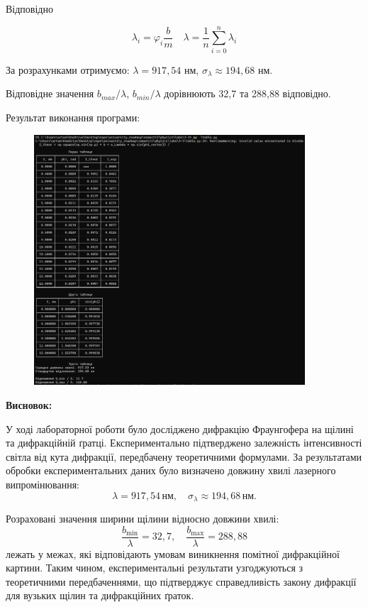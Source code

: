 \documentclass[12pt,a4paper]{article}
\begin{document}
    Відповідно

    \[
    \lambda_i = \varphi_i\frac{b}{m} \quad \lambda = \frac{1}{n} \sum_{i=0}^{n} \lambda_i
    \]

    За розрахунками отримуємо: $\lambda = 917,54$ нм, $\sigma_{\lambda} \approx 194,68 $ нм.

    Відповідне значення $b_{max}\slash \lambda$, $b_{min} \slash \lambda$ дорівнюють 32,7 та 288,88 відповідно.

    \newpage

    \setlength{\parindent}{0pt}

    Результат виконання програми:

    \begin{figure}[ht]
        \includegraphics[width=0.9\textwidth]{programm_running.png}
    \end{figure}

    \newpage

    \textbf{Висновок:}

    У ході лабораторної роботи було досліджено дифракцію Фраунгофера на щілині та дифракційній ґратці. Експериментально підтверджено залежність інтенсивності світла від кута дифракції, передбачену теоретичними формулами. За результатами обробки експериментальних даних було визначено довжину хвилі лазерного випромінювання:
\[
\lambda = 917{,}54 \, \text{нм}, \quad \sigma_\lambda \approx 194{,}68 \, \text{нм}.
\]

Розраховані значення ширини щілини відносно довжини хвилі:
\[
\frac{b_{\min}}{\lambda} = 32{,}7, \quad \frac{b_{\max}}{\lambda} = 288{,}88
\]
лежать у межах, які відповідають умовам виникнення помітної дифракційної картини. Таким чином, експериментальні результати узгоджуються з теоретичними передбаченнями, що підтверджує справедливість закону дифракції для вузьких щілин та дифракційних ґраток.
\end{document}
